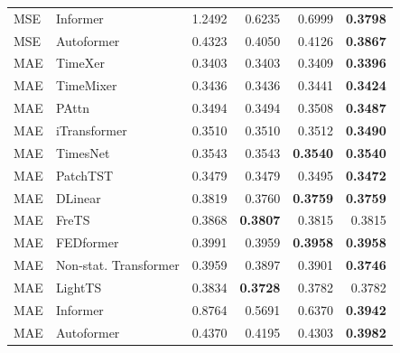 \begin{longtable}{llrrrr}
MSE & Informer & 1.2492 & 0.6235 & 0.6999 & \textbf{0.3798} \\
MSE & Autoformer & 0.4323 & 0.4050 & 0.4126 & \textbf{0.3867} \\
\midrule
MAE & TimeXer & 0.3403 & 0.3403 & 0.3409 & \textbf{0.3396} \\
MAE & TimeMixer & 0.3436 & 0.3436 & 0.3441 & \textbf{0.3424} \\
MAE & PAttn & 0.3494 & 0.3494 & 0.3508 & \textbf{0.3487} \\
MAE & iTransformer & 0.3510 & 0.3510 & 0.3512 & \textbf{0.3490} \\
MAE & TimesNet & 0.3543 & 0.3543 & \textbf{0.3540} & \textbf{0.3540} \\
MAE & PatchTST & 0.3479 & 0.3479 & 0.3495 & \textbf{0.3472} \\
MAE & DLinear & 0.3819 & 0.3760 & \textbf{0.3759} & \textbf{0.3759} \\
MAE & FreTS & 0.3868 & \textbf{0.3807} & 0.3815 & 0.3815 \\
MAE & FEDformer & 0.3991 & 0.3959 & \textbf{0.3958} & \textbf{0.3958} \\
MAE & Non-stat. Transformer & 0.3959 & 0.3897 & 0.3901 & \textbf{0.3746} \\
MAE & LightTS & 0.3834 & \textbf{0.3728} & 0.3782 & 0.3782 \\
MAE & Informer & 0.8764 & 0.5691 & 0.6370 & \textbf{0.3942} \\
MAE & Autoformer & 0.4370 & 0.4195 & 0.4303 & \textbf{0.3982} \\
\end{longtable}
\endgroup

